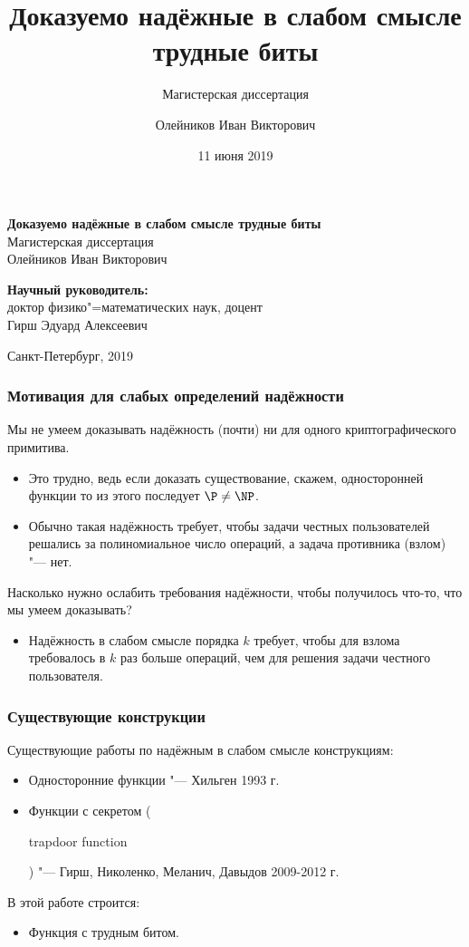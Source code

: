 \documentclass[mathserif,serif]{beamer} %
\title{Доказуемо надёжные в слабом смысле трудные биты}
\subtitle{Магистерская диссертация}
\author{Олейников Иван Викторович}
\date{11 июня 2019}
\theoremstyle{definition}
\theoremstyle{remark}
\begin{document}
\begin{frame}
\vspace{2cm}
\begin{center}
  \textbf{Доказуемо надёжные в слабом смысле трудные биты}
  \\
  Магистерская диссертация
  \\[1em]
  {
    Олейников Иван Викторович
  }
  \\[2em]
\end{center}

\hfill
\begin{minipage}{0.45\textwidth}
\textbf{Научный руководитель:} \\
доктор физико"=математических наук, доцент \\
Гирш Эдуард Алексеевич
\end{minipage}

\begin{center}
\mbox{}
\vfill
\small Санкт-Петербург, 2019
\end{center}
\end{frame}

\begin{frame}
  \frametitle{Мотивация для слабых определений надёжности}
  Мы не умеем доказывать надёжность (почти) ни для одного криптографического
  примитива.
  \begin{itemize}
  \item Это трудно, ведь если доказать существование, скажем, односторонней
  функции то из этого последует $\P \neq \NP$.
  \item Обычно такая надёжность требует, чтобы задачи честных пользователей
  решались за полиномиальное число операций, а задача противника (взлом) "---
  нет.
  \end{itemize}
  \pause
  Насколько нужно ослабить требования надёжности, чтобы получилось что-то, что
  мы умеем доказывать?
  \begin{itemize}
  \item Надёжность в слабом смысле порядка $k$ требует, чтобы для взлома
  требовалось в $k$ раз больше операций, чем для решения задачи честного
  пользователя.
  \end{itemize}
\end{frame}

\begin{frame}
  \frametitle{Существующие конструкции}
  Существующие работы по надёжным в слабом смысле конструкциям:
  \begin{itemize}
  \item Односторонние функции "--- Хильген 1993 г.
  \item Функции с секретом (\begin{english}trapdoor function\end{english}) "---
  Гирш, Николенко, Меланич, Давыдов 2009-2012 г.
  \end{itemize}
  \pause
  В этой работе строится:
  \begin{itemize}
  \item Функция с трудным битом.
  \end{itemize}
\end{frame}
\end{document}
